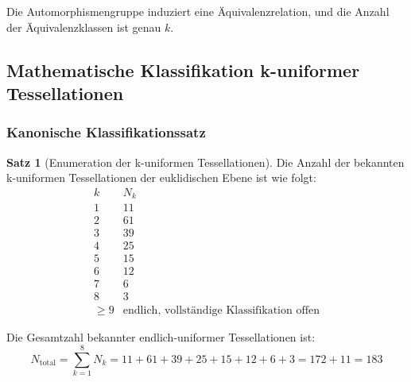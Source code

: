 \documentclass[a4paper,12pt]{article}
\theoremstyle{definition}
\newtheorem{satz}{Satz}[section]
\begin{document}
Die Automorphismengruppe induziert eine Äquivalenzrelation, und die Anzahl der Äquivalenzklassen ist genau $k$.

\subsection{Mathematische Klassifikation k-uniformer Tessellationen}

\subsubsection{Kanonische Klassifikationssatz}

\begin{satz}[Enumeration der k-uniformen Tessellationen]
	Die Anzahl der bekannten k-uniformen Tessellationen der euklidischen Ebene ist wie folgt:
	\[
	\begin{array}{c|c}
		k & N_k \\
		\hline
		1 & 11 \\
		2 & 61 \\
		3 & 39 \\
		4 & 25 \\
		5 & 15 \\
		6 & 12 \\
		7 & 6 \\
		8 & 3 \\
		\geq 9 & \text{endlich, vollständige Klassifikation offen}
	\end{array}
	\]
	
	Die Gesamtzahl bekannter endlich-uniformer Tessellationen ist:
	\[
	N_{\text{total}} = \sum_{k=1}^{8} N_k = 11 + 61 + 39 + 25 + 15 + 12 + 6 + 3 = 172 + 11 = 183
	\]
\end{satz}
\end{document}
